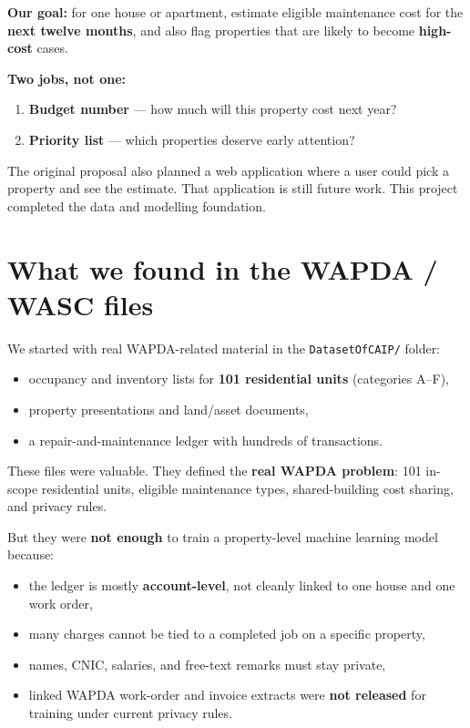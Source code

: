 \documentclass[11pt,a4paper]{article}
\begin{document}
\textbf{Our goal:} for one house or apartment, estimate eligible maintenance cost for the \textbf{next twelve months}, and also flag properties that are likely to become \textbf{high-cost} cases.

\textbf{Two jobs, not one:}
\begin{enumerate}
  \item \textbf{Budget number} --- how much will this property cost next year?
  \item \textbf{Priority list} --- which properties deserve early attention?
\end{enumerate}

The original proposal also planned a web application where a user could pick a property and see the estimate. That application is still future work. This project completed the data and modelling foundation.

\section{What we found in the WAPDA / WASC files}

We started with real WAPDA-related material in the \texttt{DatasetOfCAIP/} folder:
\begin{itemize}
  \item occupancy and inventory lists for \textbf{101 residential units} (categories A--F),
  \item property presentations and land/asset documents,
  \item a repair-and-maintenance ledger with hundreds of transactions.
\end{itemize}

These files were valuable. They defined the \textbf{real WAPDA problem}: 101 in-scope residential units, eligible maintenance types, shared-building cost sharing, and privacy rules.

But they were \textbf{not enough} to train a property-level machine learning model because:
\begin{itemize}
  \item the ledger is mostly \textbf{account-level}, not cleanly linked to one house and one work order,
  \item many charges cannot be tied to a completed job on a specific property,
  \item names, CNIC, salaries, and free-text remarks must stay private,
  \item linked WAPDA work-order and invoice extracts were \textbf{not released} for training under current privacy rules.
\end{itemize}
\end{document}
